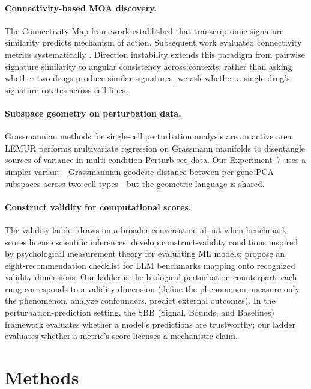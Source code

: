 \documentclass{article}
\begin{document}
\paragraph{Connectivity-based MOA discovery.}
The Connectivity Map framework \citep{subramanian2017next,lamb2006connectivity}
established that transcriptomic-signature similarity predicts mechanism of
action. Subsequent work evaluated connectivity metrics systematically
\citep{li2020comprehensive}. Direction instability extends this paradigm from
pairwise signature similarity to angular consistency across contexts: rather
than asking whether two drugs produce similar signatures, we ask whether a
single drug's signature rotates across cell lines.

\paragraph{Subspace geometry on perturbation data.}
Grassmannian methods for single-cell perturbation analysis are an active
area. LEMUR \citep{ahlmanneltze2025lemur} performs multivariate regression on
Grassmann manifolds to disentangle sources of variance in multi-condition
Perturb-seq data. Our Experiment~7 uses a simpler variant---Grassmannian
geodesic distance between per-gene PCA subspaces across two cell types---but
the geometric language is shared.

\paragraph{Construct validity for computational scores.}
The validity ladder draws on a broader conversation about when benchmark
scores license scientific inferences.
\citet{freiesleben2025benchmarking} develop construct-validity conditions
inspired by psychological measurement theory for evaluating ML models;
\citet{watson2025measuring} propose an eight-recommendation checklist for
LLM benchmarks mapping onto recognized validity dimensions.
Our ladder is the biological-perturbation counterpart: each rung corresponds
to a validity dimension (define the phenomenon, measure only the phenomenon,
analyze confounders, predict external outcomes). In the perturbation-prediction
setting, the SBB (Signal, Bounds, and Baselines) framework
\citep{sbb2026principles} evaluates whether a model's predictions are
trustworthy; our ladder evaluates whether a metric's score licenses a
mechanistic claim.

\section{Methods}
\end{document}
